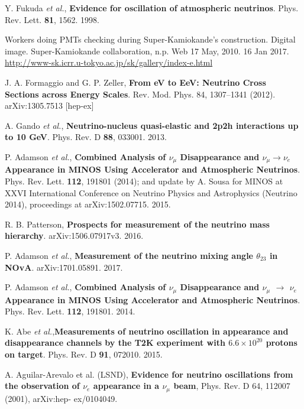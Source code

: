  Y. Fukuda \textit{et al.}, \textbf{Evidence for oscillation of atmospheric neutrinos}. Phys. Rev. Lett. \textbf{81}, 1562. 1998.  

 Workers doing PMTs checking during Super-Kamiokande's construction. Digital image. Super-Kamiokande collaboration, n.p. Web 17 May, 2010. 16 Jan 2017. \href{http://www-sk.icrr.u-tokyo.ac.jp/sk/gallery/index-e.html}{http://www-sk.icrr.u-tokyo.ac.jp/sk/gallery/index-e.html}

 J. A. Formaggio and G. P. Zeller, \textbf{From eV to EeV: Neutrino Cross Sections across Energy Scales}. Rev. Mod. Phys. 84, 1307–1341 (2012). arXiv:1305.7513 [hep-ex]

 A. Gando \textit{et al.}, \textbf{Neutrino-nucleus quasi-elastic and 2p2h interactions up to 10 GeV}. Phys. Rev. D \textbf{88}, 033001. 2013.

 P. Adamson \textit{et al.}, \textbf{Combined Analysis of $\nu_\mu$ Disappearance and $\nu_\mu \rightarrow \nu_e$ Appearance in MINOS Using Accelerator and Atmospheric Neutrinos}. Phys. Rev. Lett. \textbf{112}, 191801 (2014); and update by A. Sousa for MINOS at XXVI International
Conference on Neutrino Physics and Astrophysics (Neutrino 2014), proceedings at arXiv:1502.07715. 2015.

 R. B. Patterson, \textbf{Prospects for measurement of the neutrino mass hierarchy}. arXiv:1506.07917v3. 2016.

 P. Adamson \textit{et al.}, \textbf{Measurement of the neutrino mixing angle $\theta_{23}$ in NOvA}. arXiv:1701.05891. 2017.

 P. Adamson \textit{et al.}, \textbf{Combined Analysis of $\nu_\mu$ Disappearance and $\nu_\mu$ $\rightarrow $ $\nu_e$ Appearance in MINOS Using Accelerator and Atmospheric Neutrinos}. Phys. Rev. Lett. \textbf{112}, 191801. 2014.

 K. Abe \textit{et al.},\textbf{Measurements of neutrino oscillation in appearance and disappearance channels by the T2K experiment with $6.6 \times 10^{20} $ protons on target}. Phys. Rev. D \textbf{91}, 072010. 2015.

 A. Aguilar-Arevalo et al. (LSND), \textbf{Evidence for neutrino oscillations from the observation of $\nu_e$ appearance in a $\nu_{\mu}$ beam}, Phys. Rev. D 64, 112007 (2001), arXiv:hep- ex/0104049.

